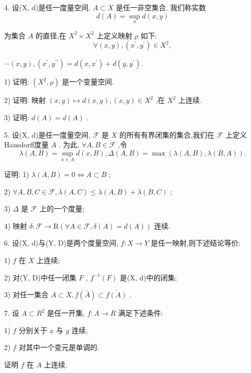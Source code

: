 4. 设(X, d)是任一度量空间, $A \subset  X$ 是任一非空集合. 我们称实数
$$d\left( A\right)  = \mathop{\sup }\limits_{x}d\left( {x,y}\right)$$

为集合 $A$ 的直径,在 ${X}^{2} \times  {X}^{2}$ 上定义映射 $\rho$ 如下:
$$\forall \left( {x,y}\right) ,\left( {{x}^{\prime },{y}^{\prime }}\right)  \in  {X}^{2},$$

$\cdots \left( {x,y}\right) ,\left( {{x}^{\prime },{y}^{\prime \prime }}\right)  = d\left( {x,{x}^{\prime }}\right)  + d\left( {y,{y}^{\prime }}\right) .$

1) 证明: $\left( {{X}^{2},\rho }\right)$ 是一个变量空间.

2) 证明: 映射 $\left( {x,y}\right)  \mapsto  d\left( {x,y}\right) ,\left( {x,y}\right)  \in  {X}^{2}$ ,在 ${X}^{2}$ 上连续.

3) 证明: $d\left( A\right)  = d\left( A\right)$ .

5. 设(X, d)是任一度量空间, $\mathcal{F}$ 是 $X$ 的所有有界闭集的集合,我们在 $\mathcal{F}$ 上定义Hausdorff度量 $A$ . 为此, $\forall A,B \in  \mathcal{F}$ ,令
$$\lambda \left( {A,B}\right)  = \mathop{\sup }\limits_{{x \in  A}}d\left( {x,B}\right) ,\Delta \left( {A,B}\right)  = \max \left( {\lambda \left( {A,B}\right) ,\lambda \left( {B,A}\right) }\right) .$$

证明: 1) $\lambda \left( {A,B}\right)  = 0 \Leftrightarrow  A \subset  B$ ;

2) $\forall A,B,C \in  \mathcal{F},\lambda \left( {A,C}\right)  \leq  \lambda \left( {A,B}\right)  + \lambda \left( {B,C}\right)$ ;

3) $\Delta$ 是 $\mathcal{F}$ 上的一个度量;

4) 映射 $\delta  : \mathcal{F} \rightarrow  \mathrm{R}\left( {\forall A \in  \mathcal{F},\delta \left( A\right)  = d\left( A\right) }\right)$ 连续.

6. 设(X, d)与(Y, D)是两个度量空间, $f : X \rightarrow  Y$ 是任一映射,则下述结论等价:

1) $f$ 在 $X$ 上连续;

2) 对(Y, D)中任一闭集 $F$ , ${f}^{-1}\left( F\right)$ 是(X, d)中的闭集;

3) 对任一集合 $A \subset  X,f\left( \bar{A}\right)  \subset  \overline{f\left( A\right) }$ .

7. 设 $A \subset  {R}^{2}$ 是任一开集, $f : A \rightarrow  R$ 满足下述条件:

1) $f$ 分别关于 $x$ 与 $y$ 连续,

2) $f$ 对其中一个变元是单调的.

证明 $f$ 在 $A$ 上连续.

